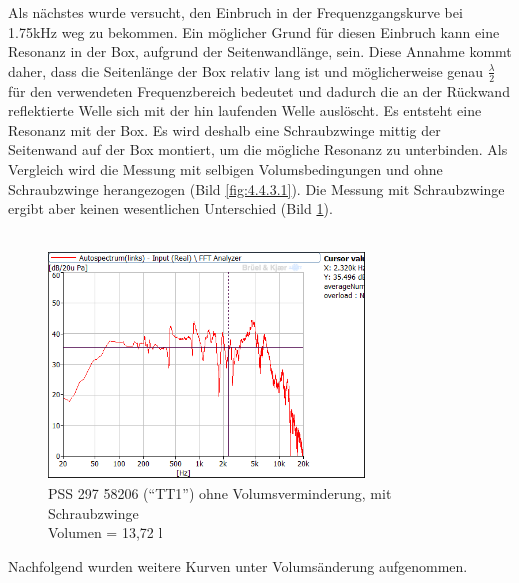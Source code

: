 \newpage
Als nächstes wurde versucht, den Einbruch in der Frequenzgangskurve bei 1.75kHz weg zu bekommen.
Ein möglicher Grund für diesen Einbruch kann eine Resonanz in der Box, aufgrund der Seitenwandlänge, sein.
Diese Annahme kommt daher, dass die Seitenlänge der Box relativ lang ist und möglicherweise genau $\frac{\lambda}{2}$ für den verwendeten Frequenzbereich bedeutet und dadurch die an der Rückwand reflektierte Welle sich mit der hin laufenden Welle auslöscht.
Es entsteht eine Resonanz mit der Box.
Es wird deshalb eine Schraubzwinge mittig der Seitenwand auf der Box montiert, um die mögliche Resonanz zu unterbinden.
Als Vergleich wird die Messung mit selbigen Volumsbedingungen und ohne Schraubzwinge herangezogen (Bild \ref{fig:4.4.3.1}).
Die Messung mit Schraubzwinge ergibt aber keinen wesentlichen Unterschied (Bild \ref{fig:4.4.3.3}).\\ \\

\begin{figure} [H]
	\centering
	\includegraphics[width=0.75\textwidth]{img/Optimierung/TT/TT1_ohneAllem_Schraubzwinge.png}
	\caption{PSS 297 58206 (\enquote{TT1}) ohne Volumsverminderung, mit Schraubzwinge \\Volumen = 13,72 l}
	\label{fig:4.4.3.3}
\end{figure}

\newpage
Nachfolgend wurden weitere Kurven unter Volumsänderung aufgenommen.

